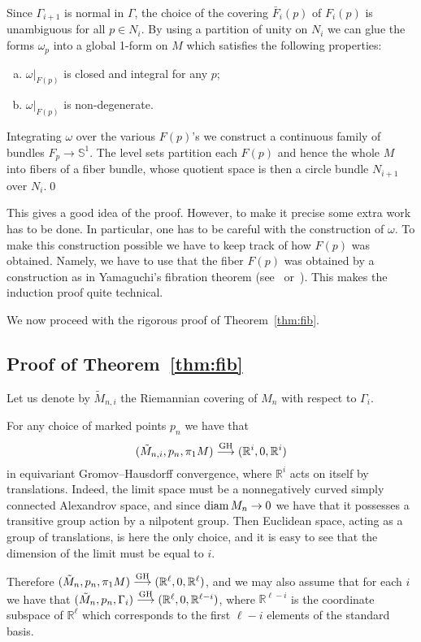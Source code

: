 \documentclass{amsart}
\begin{document}
Since $\Gamma_{i+1}$ is normal in $\Gamma$,
the choice of the covering $\bar{F}_i(p)$ of $F_i(p)$
is unambiguous for all $p\in N_i$.
By using a partition of unity on $N_i$ we can
glue the forms $\omega_p$ into a global 1-form on $M$
which  satisfies the following properties:
\begin{enumerate}[a)]
\item $\omega|_{F(p)}$ is closed  and integral for any $p$;
\item  $\omega|_{F(p)}$ is non-degenerate.
\end{enumerate}



Integrating $\omega$ over the various $F(p)$'s
we construct a continuous family of bundles $F_p\to \mathbb{S}^{1}$.
The level sets
partition each $F(p)$ and hence the whole $M$ into fibers of a fiber bundle,
whose quotient space is then a circle bundle $N_{i+1}$ over $N_i$.\qed

\medskip

This gives a good idea of the proof.
However, to make it precise some extra work has to be done.
In particular,  one has to be careful with the construction of $\omega$.
To make this construction possible
we have to keep track of how $F(p)$  was obtained.
Namely, we have to use that the fiber $F(p)$
was obtained by a construction as in Yamaguchi's
fibration theorem (see~\cite{Yam} or~\cite{BGP}).
This makes the induction proof quite technical.

We now proceed with the rigorous proof of Theorem~\ref{thm:fib}.

\subsection{Proof of Theorem~\ref{thm:fib}}
Let us denote by  $\tilde M_{n,i}$
the Riemannian covering of $M_n$ with respect to $\Gamma_i$.

For any choice of marked points $p_n$
we have that
$$(\tilde M_{n,i},p_n,\pi_1M)\GHto (\mathbb{R}^i,0,\mathbb{R}^i)$$
in equivariant Gromov--Hausdorff convergence,
where $\mathbb{R}^i$ acts on itself by translations.
Indeed, the limit space must be a
nonnegatively curved simply connected Alexandrov space,
and since $\operatorname{\rm diam} M_n\to0$ we have that it possesses
a transitive group action by a nilpotent group.
Then Euclidean space, acting as a group of translations,
is here the only choice,
and it is easy to see that the dimension of the limit  must be equal to $i$.

Therefore $(\tilde M_{n},p_n,\pi_1M)\GHto (\mathbb{R}^\ell,0,\mathbb{R}^\ell)$,
and we may also assume that for each $i$
we have that $(\tilde M_{n},p_n,\Gamma_i)\GHto (\mathbb{R}^\ell,0, \mathbb{R}^{\ell-i})$,
where $\mathbb{R}^{\ell-i}$ is the coordinate subspace of $\mathbb{R}^\ell$
which corresponds to the first $\ell-i$ elements of the standard basis.
\end{document}
